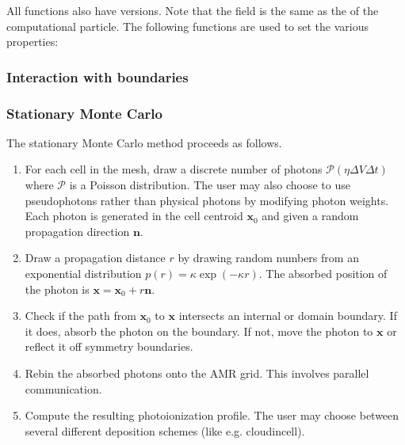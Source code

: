 \documentclass[letterpaper,10pt,english]{sphinxmanual}
\begin{document}
All functions also have  versions.
Note that the field  is the same as the  of the computational particle.
The following functions are used to set the various properties:

\begin{sphinxVerbatim}[commandchars=\\\{\},formatcom=\scriptsize]
  
  
  
  
\end{sphinxVerbatim}


\subsubsection{Interaction with boundaries}
\label{\detokenize{Solvers/RTE:interaction-with-boundaries}}

\subsubsection{Stationary Monte Carlo}
\label{\detokenize{Solvers/RTE:stationary-monte-carlo}}
The stationary Monte Carlo method proceeds as follows.
\begin{enumerate}
%
\item {} 
For each cell in the mesh, draw a discrete number of photons \(\mathcal{P}\left(\eta \Delta V\Delta t\right)\) where \(\mathcal{P}\) is a Poisson distribution. The user may also choose to use pseudophotons rather than physical photons by modifying photon weights. Each photon is generated in the cell centroid \(\mathbf{x}_0\) and given a random propagation direction \(\mathbf{n}\).

\item {} 
Draw a propagation distance \(r\) by drawing random numbers from an exponential distribution \(p(r) = \kappa \exp\left(-\kappa r\right)\). The absorbed position of the photon is \(\mathbf{x} = \mathbf{x}_0 + r\mathbf{n}\).

\item {} 
Check if the path from \(\mathbf{x}_0\) to \(\mathbf{x}\) intersects an internal or domain boundary. If it does, absorb the photon on the boundary. If not, move the photon to \(\mathbf{x}\) or reflect it off symmetry boundaries.

\item {} 
Rebin the absorbed photons onto the AMR grid. This involves parallel communication.

\item {} 
Compute the resulting photoionization profile. The user may choose between several different deposition schemes (like e.g. cloud\sphinxhyphen{}in\sphinxhyphen{}cell).

\end{enumerate}
\end{document}
